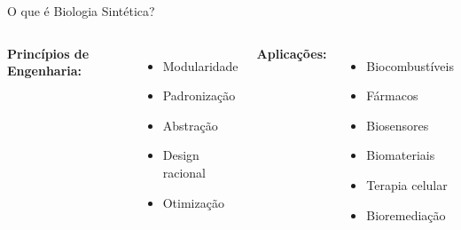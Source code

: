 \begin{frame}{O que é Biologia Sintética?}

\vspace{0.3cm}

\begin{columns}
\textbf{Princípios de Engenharia:}
\begin{itemize}
    \item Modularidade
    \item Padronização
    \item Abstração
    \item Design racional
    \item Otimização
\end{itemize}

\textbf{Aplicações:}
\begin{itemize}
    \item Biocombustíveis
    \item Fármacos
    \item Biosensores
    \item Biomateriais
    \item Terapia celular
    \item Bioremediação
\end{itemize}
\end{columns}
\end{frame}

